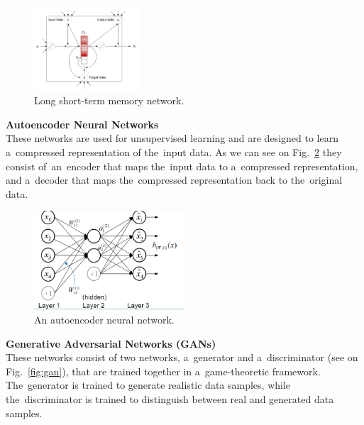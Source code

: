     \begin{center}
        \begin{figure}[!ht]
            \centering
            \includegraphics[width=0.35\textwidth]{figures/ltmn}
            \caption{Long short-term memory network. \cite{cheng2016long}}
            \label{fig:ltmn}
        \end{figure}
    \end{center}
\newpage
\textbf{Autoencoder Neural Networks}\\
These networks are used for unsupervised learning and are designed to learn a~compressed representation of the~input data. As we can see on Fig.~\ref{fig:ann} they consist of~an~encoder that maps the~input data to a~compressed representation, and a~decoder that maps the~compressed representation back to the~original data.
    \begin{center}
        \begin{figure}[!ht]
            \centering
            \includegraphics[width=0.5\textwidth]{figures/ann}
            \caption{An autoencoder neural network. \cite{luo2018distributed}}
            \label{fig:ann}
        \end{figure}
    \end{center}
\textbf{Generative Adversarial Networks (GANs)}\\
These networks consist of two networks, a~generator and a~discriminator (see on Fig.~\ref{fig:gan}), that are trained together in a~game-theoretic framework. The~generator is trained to generate realistic data samples, while the~discriminator is trained to distinguish between real and generated data samples.
